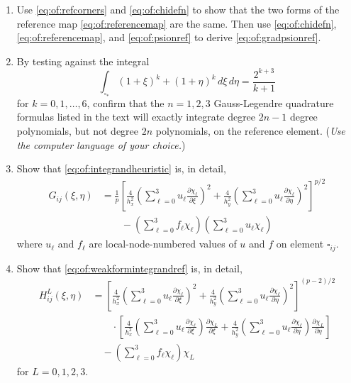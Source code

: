 \begin{enumerate}
\item  Use \eqref{eq:of:refcorners} and \eqref{eq:of:chidefn} to show that the two forms of the reference map \eqref{eq:of:referencemap} are the same.  Then use \eqref{eq:of:chidefn}, \eqref{eq:of:referencemap}, and \eqref{eq:of:psionref} to derive \eqref{eq:of:gradpsionref}.

\item By testing against the integral
    $$\int_{\square_\ast} (1+\xi)^k + (1+\eta)^k\,d\xi\, d\eta = \frac{2^{k+3}}{k+1}$$
for $k=0,1,\dots,6$, confirm that the $n=1,2,3$ Gauss-Legendre quadrature formulas listed in the text will exactly integrate degree $2n-1$ degree polynomials, but not degree $2n$ polynomials, on the reference element.  (\emph{Use the computer language of your choice.})

\item \label{exer:of:integrand}  Show that \eqref{eq:of:integrandheuristic} is, in detail,
\begin{align*}
G_{ij}(\xi,\eta) &= \frac{1}{p} \left[\frac{4}{h_x^2} \left(\sum_{\ell=0}^3 u_\ell \frac{\partial\chi_\ell}{\partial \xi}\right)^2 + \frac{4}{h_y^2} \left(\sum_{\ell=0}^3 u_\ell \frac{\partial\chi_\ell}{\partial \eta}\right)^2\right]^{p/2} \\
  &\qquad - \left(\sum_{\ell=0}^3 f_\ell \chi_\ell\right) \left(\sum_{\ell=0}^3 u_\ell \chi_\ell\right)
\end{align*}
where $u_\ell$ and $f_\ell$ are local-node-numbered values of $u$ and $f$ on element $\square_{ij}$.

\item \label{exer:of:weakformintegrand}  Show that \eqref{eq:of:weakformintegrandref} is, in detail,
\begin{align*}
H_{ij}^L(\xi,\eta) &= \left[\frac{4}{h_x^2} \left(\sum_{\ell=0}^3 u_\ell \frac{\partial\chi_\ell}{\partial \xi}\right)^2 + \frac{4}{h_y^2} \left(\sum_{\ell=0}^3 u_\ell \frac{\partial\chi_\ell}{\partial \eta}\right)^2\right]^{(p-2)/2} \\
  &\qquad \cdot \left[\frac{4}{h_x^2} \left(\sum_{\ell=0}^3 u_\ell \frac{\partial\chi_\ell}{\partial \xi}\right) \frac{\partial\chi_L}{\partial \xi} + \frac{4}{h_y^2} \left(\sum_{\ell=0}^3 u_\ell \frac{\partial\chi_\ell}{\partial \eta}\right) \frac{\partial\chi_L}{\partial \eta}\right] \\
  &\quad - \left(\sum_{\ell=0}^3 f_\ell \chi_\ell\right) \chi_L
\end{align*}
for $L=0,1,2,3$.


\end{enumerate}
